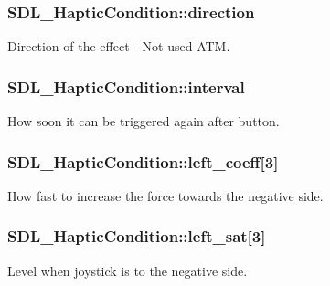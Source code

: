 \subsubsection[{direction}]{ S\+D\+L\+\_\+\+Haptic\+Condition\+::direction}\label{struct_s_d_l___haptic_condition_a728507d30d18998949313de3a25e5581}
Direction of the effect -\/ Not used A\+T\+M. \hypertarget{struct_s_d_l___haptic_condition_aafc182abea1078bed7e9cf5d0e713ea2}{}
\subsubsection[{interval}]{ S\+D\+L\+\_\+\+Haptic\+Condition\+::interval}\label{struct_s_d_l___haptic_condition_aafc182abea1078bed7e9cf5d0e713ea2}
How soon it can be triggered again after button. \hypertarget{struct_s_d_l___haptic_condition_a2adf52c32f60f0b6826b1e3add2eae7a}{}
\subsubsection[{left\+\_\+coeff}]{ S\+D\+L\+\_\+\+Haptic\+Condition\+::left\+\_\+coeff\mbox{[}3\mbox{]}}\label{struct_s_d_l___haptic_condition_a2adf52c32f60f0b6826b1e3add2eae7a}
How fast to increase the force towards the negative side. \hypertarget{struct_s_d_l___haptic_condition_a953448774c40818a4f47c6efea21124d}{}
\subsubsection[{left\+\_\+sat}]{ S\+D\+L\+\_\+\+Haptic\+Condition\+::left\+\_\+sat\mbox{[}3\mbox{]}}\label{struct_s_d_l___haptic_condition_a953448774c40818a4f47c6efea21124d}
Level when joystick is to the negative side. \hypertarget{struct_s_d_l___haptic_condition_ad0efb0a6ddc20f058e87199eaaa95978}{}
